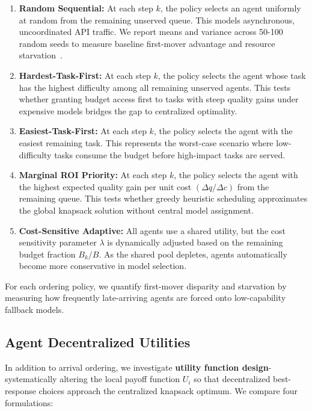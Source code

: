 \documentclass{article}
\begin{document}
\begin{enumerate}[leftmargin=*]
    \item \textbf{Random Sequential:} At each step $k$, the policy selects an agent uniformly at random from the remaining unserved queue. This models asynchronous, uncoordinated API traffic. We report means and variance across 50-100 random seeds to measure baseline first-mover advantage and resource starvation~\cite{nisan2007algorithmic}.
    \item \textbf{Hardest-Task-First:} At each step $k$, the policy selects the agent whose task has the highest difficulty among all remaining unserved agents. This tests whether granting budget access first to tasks with steep quality gains under expensive models bridges the gap to centralized optimality.
    \item \textbf{Easiest-Task-First:} At each step $k$, the policy selects the agent with the easiest remaining task. This represents the worst-case scenario where low-difficulty tasks consume the budget before high-impact tasks are served.
    \item \textbf{Marginal ROI Priority:} At each step $k$, the policy selects the agent with the highest expected quality gain per unit cost $(\Delta q / \Delta c)$ from the remaining queue. This tests whether greedy heuristic scheduling approximates the global knapsack solution without central model assignment.
    \item \textbf{Cost-Sensitive Adaptive:} All agents use a shared utility, but the cost sensitivity parameter $\lambda$ is dynamically adjusted based on the remaining budget fraction $B_k / B$. As the shared pool depletes, agents automatically become more conservative in model selection.
\end{enumerate}

For each ordering policy, we quantify first-mover disparity and starvation by measuring how frequently late-arriving agents are forced onto low-capability fallback models.

\subsection{Agent Decentralized Utilities}
\label{sec:utilities}

In addition to arrival ordering, we investigate \textbf{utility function design}-systematically altering the local payoff function $U_i$ so that decentralized best-response choices approach the centralized knapsack optimum. We compare four formulations:
\end{document}
